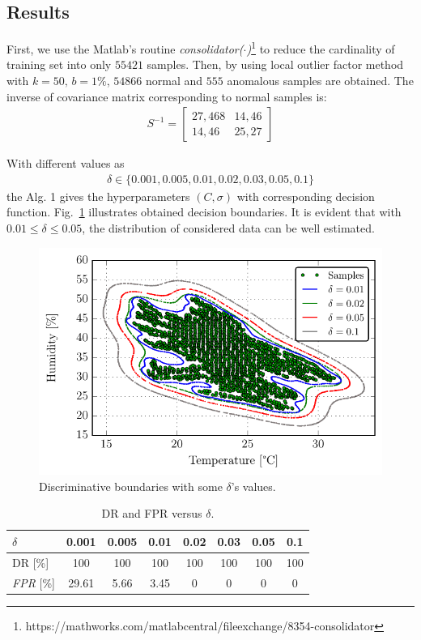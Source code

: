 \documentclass[conference]{IEEEtran}
\theoremstyle{problemstyle}
\begin{document}
\subsection{Results}

First, we use the Matlab's routine \emph{consolidator($\cdot$)}\footnote{https://mathworks.com/matlabcentral/fileexchange/8354-consolidator} to reduce the cardinality of training set into only $55421$ samples. Then, by using local outlier factor method with $k = 50 \text{, } b = 1 \%$, $54866$ normal and $555$ anomalous samples are obtained. The inverse of covariance matrix corresponding to normal samples is:
\begin{align}
S^{-1} = \begin{bmatrix}
27,468 & 14,46 \\
14,46 & 25,27
\end{bmatrix}
\end{align}

With different values as
\begin{align}
\delta \in \{ 0.001, 0.005, 0.01, 0.02, 0.03, 0.05, 0.1 \}
\end{align}
the Alg. 1 gives the hyperparameters $(C,\sigma)$ with corresponding decision function. Fig.~\ref{fig:domain_boundary} illustrates obtained decision boundaries. It is evident that with $0.01 \le \delta \le 0.05$, the distribution of considered data can be well estimated. 
\begin{figure}[H]
\centering
\includegraphics[scale=.6]{Figs/data_description.pdf}
\caption{Discriminative boundaries with some $\delta$'s values.}
\label{fig:domain_boundary}
\end{figure}
 
\begin{table}[H]
\begin{tabular}{lccccccc}
$\delta$ & 0.001 & 0.005 & 0.01 & 0.02 & 0.03 & 0.05 & 0.1 \\\midrule[\lightrulewidth]
DR [\%] & 100 & 100 & 100 & 100 & 100 & 100 & 100 \\
\emph{FPR} [\%] & 29.61 & 5.66 & 3.45 & 0 & 0 & 0 &0 \\\midrule[\lightrulewidth]
\end{tabular}
\caption{DR and FPR versus $\delta$.}
\label{table:delta_eval}
\end{table}
\end{document}
